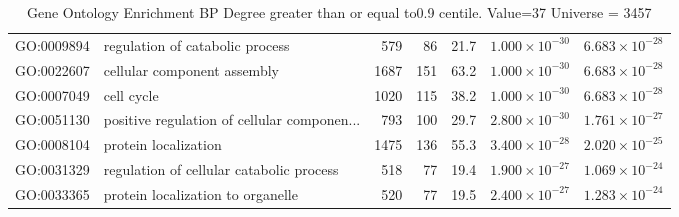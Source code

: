 \begin{table}[ht]
\begin{adjustbox}{max width=\textwidth}
\begin{tabular}{llrrrrr}
  GO:0009894 & regulation of catabolic process & 579 & 86 & 21.7 & $1.000 \times 10^{-30}$ & $6.683 \times 10^{-28}$ \\ 
  GO:0022607 & cellular component assembly & 1687 & 151 & 63.2 & $1.000 \times 10^{-30}$ & $6.683 \times 10^{-28}$ \\ 
  GO:0007049 & cell cycle & 1020 & 115 & 38.2 & $1.000 \times 10^{-30}$ & $6.683 \times 10^{-28}$ \\ 
  GO:0051130 & positive regulation of cellular componen... & 793 & 100 & 29.7 & $2.800 \times 10^{-30}$ & $1.761 \times 10^{-27}$ \\ 
  GO:0008104 & protein localization & 1475 & 136 & 55.3 & $3.400 \times 10^{-28}$ & $2.020 \times 10^{-25}$ \\ 
  GO:0031329 & regulation of cellular catabolic process & 518 & 77 & 19.4 & $1.900 \times 10^{-27}$ & $1.069 \times 10^{-24}$ \\ 
  GO:0033365 & protein localization to organelle & 520 & 77 & 19.5 & $2.400 \times 10^{-27}$ & $1.283 \times 10^{-24}$ \\ 
   \hline
\end{tabular}
\end{adjustbox}
\caption{Gene Ontology Enrichment BP Degree  greater than or equal to0.9 centile.   Value=37 Universe = 3457} 
\label{tab:Gene Ontology Enrichment BP Degree  greater than or equal to0.9 centile.   Value=37 Universe = 3457}
\end{table}

